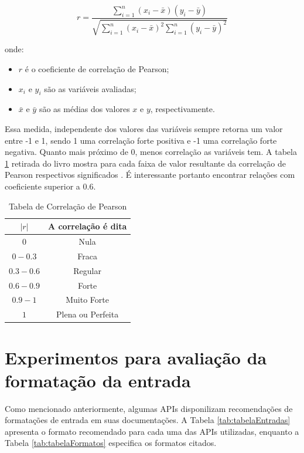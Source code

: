 \[
r = \frac{\sum_{i=1}^{n} (x_i - \bar{x})(y_i - \bar{y})}{\sqrt{\sum_{i=1}^{n} (x_i - \bar{x})^2 \sum_{i=1}^{n} (y_i - \bar{y})^2}}
\]

onde:
\begin{itemize}
    \item \(r\) é o coeficiente de correlação de Pearson;
    \item \(x_i\) e \(y_i\) são as variáveis avaliadas;
    \item \(\bar{x}\) e \(\bar{y}\) são as médias dos valores \(x\) e \(y\), respectivamente.

\end{itemize}

Essa medida, independente dos valores das variáveis sempre retorna um valor entre -1 e 1, sendo 1 uma correlação forte positiva e -1 uma correlação forte negativa. Quanto mais próximo de 0, menos correlação as variáveis tem. A tabela \ref{tab:correlacaoPearson} retirada do livro mostra para cada faixa de valor resultante da correlação de Pearson respectivos significados \cite{callegari2007}. É interessante portanto encontrar relações com coeficiente superior a 0.6.

\begin{table}[ht]
\centering
\caption{Tabela de Correlação de Pearson}
\label{tab:correlacaoPearson}
\begin{tabular}{|c|c|}
\hline
$|r|$ & A correlação é dita \\
\hline
$0$ & Nula \\
$0 - 0.3$ & Fraca \\
$0.3 - 0.6$ & Regular \\
$0.6 - 0.9$ & Forte \\
$0.9 - 1$ & Muito Forte \\
$1$ & Plena ou Perfeita \\
\hline
\end{tabular}
\end{table}

\section{Experimentos para avaliação da formatação da entrada}

Como mencionado anteriormente, algumas APIs disponilizam recomendações de formatações de entrada em suas documentações. A Tabela \ref{tab:tabelaEntradas} apresenta o formato recomendado para cada uma das APIs utilizadas, enquanto a Tabela \ref{tab:tabelaFormatos} especifica os formatos citados. 

